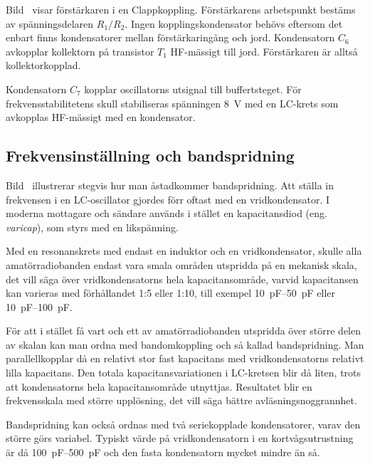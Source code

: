 Bild~ visar förstärkaren i en Clappkoppling.
Förstärkarens arbetspunkt bestäms av spänningsdelaren \(R_1/R_2\).
Ingen kopplingskondensator behövs eftersom det enbart finns kondensatorer
mellan förstärkaringång och jord.
Kondensatorn \(C_6\) avkopplar kollektorn på transistor \(T_1\) HF-mässigt till
jord.
Förstärkaren är alltså kollektorkopplad.

Kondensatorn \(C_7\) kopplar oscillatorns utsignal till buffertsteget.
För frekvensstabilitetens skull stabiliseras spänningen \qty{8}{\volt} med en
LC-krets som avkopplas HF-mässigt med en kondensator.

\subsection{Frekvensinställning och bandspridning}


Bild~ illustrerar stegvis hur man åstadkommer
bandspridning.
Att ställa in frekvensen i en LC-oscillator gjordes förr oftast med en
vridkondensator.
I moderna mottagare och sändare används i stället en kapacitansdiod 
(eng. \emph{varicap}), som styrs med en likspänning.

Med en resonanskrets med endast en induktor och en vridkondensator, skulle
alla amatörradiobanden endast vara smala områden utspridda på en mekanisk
skala, det vill säga över vridkondensatorns hela kapacitansområde, varvid
kapacitansen kan varieras med förhållandet 1:5 eller 1:10, till exempel
\SIrange{10}{50}{\pico\farad} eller \SIrange{10}{100}{\pico\farad}.

För att i stället få vart och ett av amatörradiobanden utspridda över större
delen av skalan kan man ordna med bandomkoppling och så kallad bandspridning.
Man parallellkopplar då en relativt stor fast kapacitans med vridkondensatorns
relativt lilla kapacitans.
Den totala kapacitansvariationen i LC-kretsen blir då liten, trots att
kondensatorns hela kapacitansområde utnyttjas.
Resultatet blir en frekvensskala med större upplösning, det vill säga bättre
avläsningsnoggrannhet.

Bandspridning kan också ordnas med två seriekopplade kondensatorer,
varav den större görs variabel.
Typiskt värde på vridkondensatorn i en kortvågsutrustning är då
\SIrange{100}{500}{\pico\farad} och den fasta kondensatorn mycket mindre än så.
